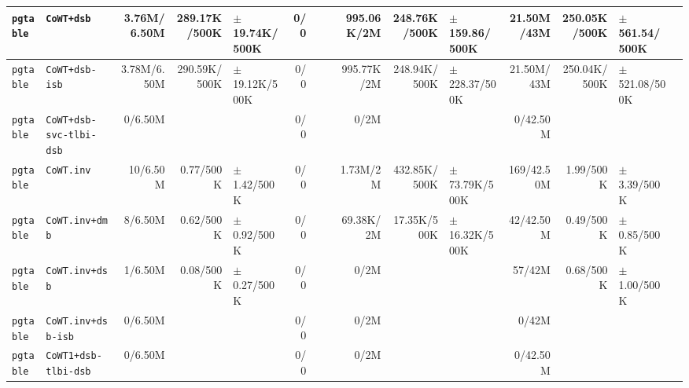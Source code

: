 \begin{tabular}{l l  | r r l | r r l | r r l | r r l l}
        \verb|pgtable| &                                             \verb|CoWT+dsb| &    3.76M/6.50M &          289.17K/500K & $\pm$ 19.74K/500K &            0/0 &                       &  &     995.06K/2M &          248.76K/500K & $\pm$ 159.86/500K &     21.50M/43M &          250.05K/500K &  $\pm$ 561.54/500K & \\ \hline 
        \verb|pgtable| &                                         \verb|CoWT+dsb-isb| &    3.78M/6.50M &          290.59K/500K & $\pm$ 19.12K/500K &            0/0 &                       &  &     995.77K/2M &          248.94K/500K & $\pm$ 228.37/500K &     21.50M/43M &          250.04K/500K &  $\pm$ 521.08/500K & \\ \hline 
        \verb|pgtable| &                                \verb|CoWT+dsb-svc-tlbi-dsb| &        0/6.50M &                       &                   &            0/0 &                       &  &           0/2M &                       &                   &       0/42.50M &                       &                    & \\ \hline 
        \verb|pgtable| &                                             \verb|CoWT.inv| &       10/6.50M &             0.77/500K &   $\pm$ 1.42/500K &            0/0 &                       &  &       1.73M/2M &          432.85K/500K & $\pm$ 73.79K/500K &     169/42.50M &             1.99/500K &    $\pm$ 3.39/500K & \\ \hline 
        \verb|pgtable| &                                         \verb|CoWT.inv+dmb| &        8/6.50M &             0.62/500K &   $\pm$ 0.92/500K &            0/0 &                       &  &      69.38K/2M &           17.35K/500K & $\pm$ 16.32K/500K &      42/42.50M &             0.49/500K &    $\pm$ 0.85/500K & \\ \hline 
        \verb|pgtable| &                                         \verb|CoWT.inv+dsb| &        1/6.50M &             0.08/500K &   $\pm$ 0.27/500K &            0/0 &                       &  &           0/2M &                       &                   &         57/42M &             0.68/500K &    $\pm$ 1.00/500K & \\ \hline 
        \verb|pgtable| &                                     \verb|CoWT.inv+dsb-isb| &        0/6.50M &                       &                   &            0/0 &                       &  &           0/2M &                       &                   &          0/42M &                       &                    & \\ \hline 
        \verb|pgtable| &                                   \verb|CoWT1+dsb-tlbi-dsb| &        0/6.50M &                       &                   &            0/0 &                       &  &           0/2M &                       &                   &       0/42.50M &                       &                    & \\ \hline 

\end{tabular}

